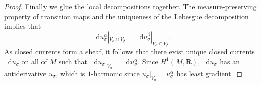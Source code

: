 \documentclass[reqno,11pt]{amsart}
\newcommand{\RR}{\mathbf{R}}
\newcommand*\dif{\mathop{}\!\mathrm{d}}
\newcommand{\dfn}[1]{\emph{#1}\index{#1}}
\theoremstyle{definition}
\newtheorem{definition}[theorem]{Definition}
\numberwithin{equation}{section}
\begin{document}
\begin{proof}
Finally we glue the local decompositions together.
The measure-preserving property of transition maps and the uniqueness of the Lebesgue decomposition implies that
$$\dif u^\alpha_\sigma|_{V_\alpha \cap V_\beta} = \dif u^\beta_\sigma|_{V_\alpha \cap V_\beta}.$$
As closed currents form a sheaf, it follows that there exist unique closed currents $\dif u_\sigma$ on all of $M$ such that $\dif u_\sigma|_{V_\alpha} = \dif u^\alpha_\sigma$.
Since $H^1(M, \RR)$, $\dif u_\sigma$ has an antiderivative $u_\sigma$, which is $1$-harmonic since $u_\sigma|_{V_\alpha} = u_\sigma^\alpha$ has least gradient.
\end{proof}



\end{document}
